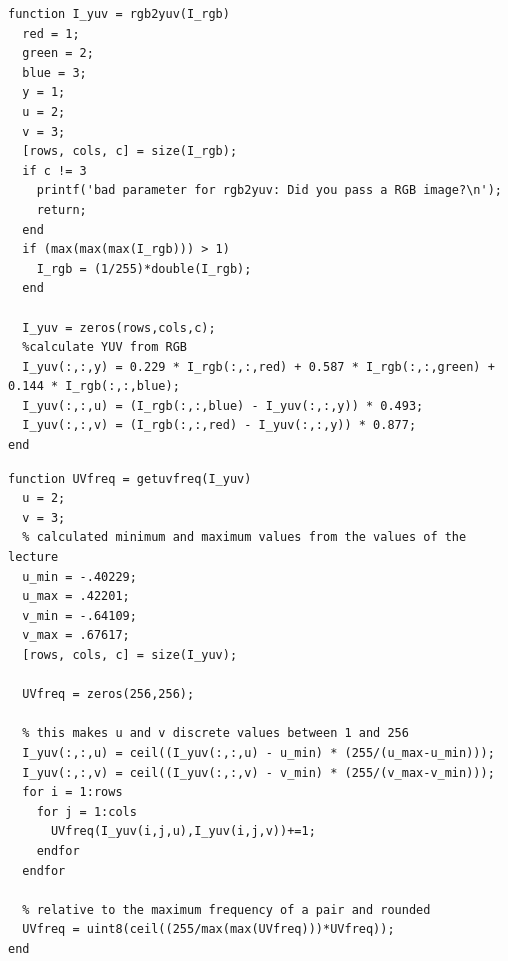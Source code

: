 \lstset{language=matlab}
\begin{lstlisting}[caption={YUV Transformation}]
function I_yuv = rgb2yuv(I_rgb)
  red = 1;
  green = 2;
  blue = 3;
  y = 1;
  u = 2;
  v = 3;
  [rows, cols, c] = size(I_rgb);
  if c != 3
    printf('bad parameter for rgb2yuv: Did you pass a RGB image?\n');
    return;
  end
  if (max(max(max(I_rgb))) > 1)
    I_rgb = (1/255)*double(I_rgb);
  end

  I_yuv = zeros(rows,cols,c);
  %calculate YUV from RGB
  I_yuv(:,:,y) = 0.229 * I_rgb(:,:,red) + 0.587 * I_rgb(:,:,green) + 0.144 * I_rgb(:,:,blue);
  I_yuv(:,:,u) = (I_rgb(:,:,blue) - I_yuv(:,:,y)) * 0.493;
  I_yuv(:,:,v) = (I_rgb(:,:,red) - I_yuv(:,:,y)) * 0.877;
end
\end{lstlisting}

\begin{lstlisting}[caption={UV Frequency Calculation}]
function UVfreq = getuvfreq(I_yuv)
  u = 2;
  v = 3;
  % calculated minimum and maximum values from the values of the lecture
  u_min = -.40229;
  u_max = .42201;
  v_min = -.64109;
  v_max = .67617;
  [rows, cols, c] = size(I_yuv);

  UVfreq = zeros(256,256);
  
  % this makes u and v discrete values between 1 and 256
  I_yuv(:,:,u) = ceil((I_yuv(:,:,u) - u_min) * (255/(u_max-u_min)));
  I_yuv(:,:,v) = ceil((I_yuv(:,:,v) - v_min) * (255/(v_max-v_min)));
  for i = 1:rows
    for j = 1:cols
      UVfreq(I_yuv(i,j,u),I_yuv(i,j,v))+=1;
    endfor
  endfor

  % relative to the maximum frequency of a pair and rounded
  UVfreq = uint8(ceil((255/max(max(UVfreq)))*UVfreq));
end
\end{lstlisting}





